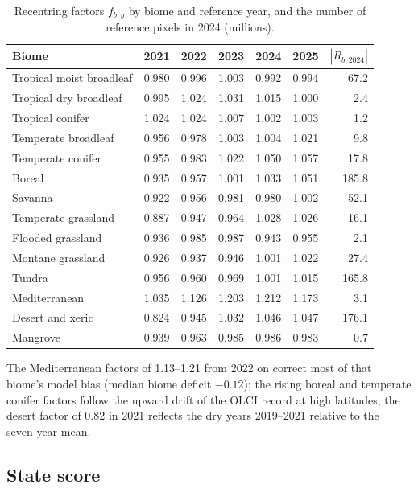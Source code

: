 \documentclass[11pt,a4paper]{article}
\begin{document}
\begin{table}[H]
\centering\small
\caption{Recentring factors $f_{b,y}$ by biome and reference year, and the number of reference
pixels in 2024 (millions).}
\label{tab:recentring}
\begin{tabular}{lcccccr}
\toprule
Biome & 2021 & 2022 & 2023 & 2024 & 2025 & $|R_{b,2024}|$ \\
\midrule
Tropical moist broadleaf & 0.980 & 0.996 & 1.003 & 0.992 & 0.994 & 67.2 \\
Tropical dry broadleaf & 0.995 & 1.024 & 1.031 & 1.015 & 1.000 & 2.4 \\
Tropical conifer & 1.024 & 1.024 & 1.007 & 1.002 & 1.003 & 1.2 \\
Temperate broadleaf & 0.956 & 0.978 & 1.003 & 1.004 & 1.021 & 9.8 \\
Temperate conifer & 0.955 & 0.983 & 1.022 & 1.050 & 1.057 & 17.8 \\
Boreal & 0.935 & 0.957 & 1.001 & 1.033 & 1.051 & 185.8 \\
Savanna & 0.922 & 0.956 & 0.981 & 0.980 & 1.002 & 52.1 \\
Temperate grassland & 0.887 & 0.947 & 0.964 & 1.028 & 1.026 & 16.1 \\
Flooded grassland & 0.936 & 0.985 & 0.987 & 0.943 & 0.955 & 2.1 \\
Montane grassland & 0.926 & 0.937 & 0.946 & 1.001 & 1.022 & 27.4 \\
Tundra & 0.956 & 0.960 & 0.969 & 1.001 & 1.015 & 165.8 \\
Mediterranean & 1.035 & 1.126 & 1.203 & 1.212 & 1.173 & 3.1 \\
Desert and xeric & 0.824 & 0.945 & 1.032 & 1.046 & 1.047 & 176.1 \\
Mangrove & 0.939 & 0.963 & 0.985 & 0.986 & 0.983 & 0.7 \\
\bottomrule
\end{tabular}
\end{table}

The Mediterranean factors of 1.13--1.21 from 2022 on correct most of that biome's model bias (median biome
deficit $-0.12$); the rising boreal and temperate conifer factors follow the upward drift of the
OLCI record at high latitudes; the desert factor of 0.82 in 2021 reflects the dry years 2019--2021
relative to the seven-year mean.

\subsection{State score}
\label{sec:score}
\end{document}
